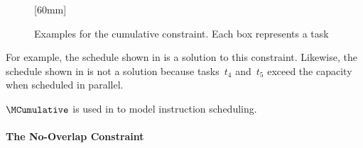 \begin{figure}
                {%
                }%
  \hfill%
                [60mm]%
                {%
                }

  \caption[Examples to illustrate the cumulative constraint]%
          {%
            Examples for the cumulative constraint.
            Each box represents a task%
          }
\end{figure}

For example, the schedule shown in  is a
\gls{solution} to this \gls{constraint}.
%
Likewise, the schedule shown in  is not a
\gls{solution} because tasks~$t_4$ and~$t_5$ exceed the capacity when scheduled
in parallel.

$\MCumulative$ is used in  to model \gls{instruction
  scheduling}.


\paragraph{The No-Overlap Constraint}

